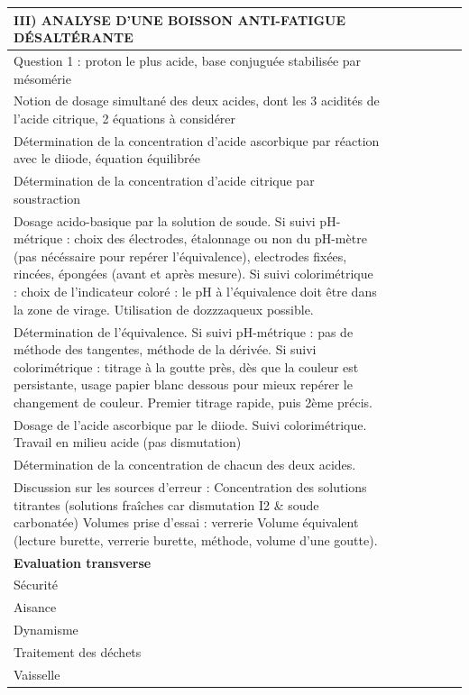 \documentclass[12pt,a3paper,landscape]{exam}
\begin{document}
\begin{longtable}{|p{6cm}|l|m{10.5cm}|l|m{10.5cm}|l|m{10.5cm}|}
\multicolumn{7}{|l|}{\textbf{III) ANALYSE D’UNE BOISSON ANTI-FATIGUE DÉSALTÉRANTE}}\\
\hline
Question 1 : proton le plus acide, base conjuguée stabilisée par mésomérie &&&&&&\\[30pt]
\hline
Notion de dosage simultané des deux acides, dont les 3 acidités de l'acide citrique, 2 équations à considérer &&&&&&\\[40pt]
\hline
Détermination de la concentration d'acide ascorbique par réaction avec le diiode, équation équilibrée &&&&&&\\[40 pt]
\hline
Détermination de la concentration d'acide citrique par soustraction &&&&&&\\[30pt]
\hline
Dosage acido-basique par la solution de soude. 
Si suivi pH-métrique : choix des électrodes, étalonnage ou non du pH-mètre (pas nécéssaire pour repérer l'équivalence), electrodes fixées, rincées, épongées (avant et après mesure).
Si suivi colorimétrique : choix de l'indicateur coloré : le pH à l'équivalence doit être dans la zone de virage. Utilisation de dozzzaqueux possible. &&&&&&\\[30pt]
\hline
Détermination de l'équivalence.
Si suivi pH-métrique : pas de méthode des tangentes, méthode de la dérivée.
Si suivi colorimétrique : titrage à la goutte près, dès que la couleur est persistante, usage papier blanc dessous pour mieux repérer le changement de couleur. Premier titrage rapide, puis 2ème précis.  &&&&&&\\[30pt]
\hline
Dosage de l'acide ascorbique par le diiode. Suivi colorimétrique. Travail en milieu acide (pas dismutation) &&&&&&\\[30pt]
\hline
Détermination de la concentration de chacun des deux acides. &&&&&&\\[30pt]
\hline
Discussion sur les sources d'erreur : \newline Concentration des solutions titrantes (solutions fraîches car dismutation I2 \& soude carbonatée) \newline Volumes prise d'essai : verrerie \newline Volume équivalent (lecture burette, verrerie burette, méthode, volume d'une goutte). &&&&&&\\[30pt]
\hline

\multicolumn{7}{|l|}{\textbf{Evaluation transverse}}\\
\hline
Sécurité &&&&&&\\[30pt]
\hline
Aisance &&&&&&\\[30pt]
\hline
Dynamisme &&&&&&\\[30pt]
\hline
Traitement des déchets&&&&&&\\[30pt]
\hline
Vaisselle &&&&&&\\[30pt]
\hline

\end{longtable}
\end{document}
